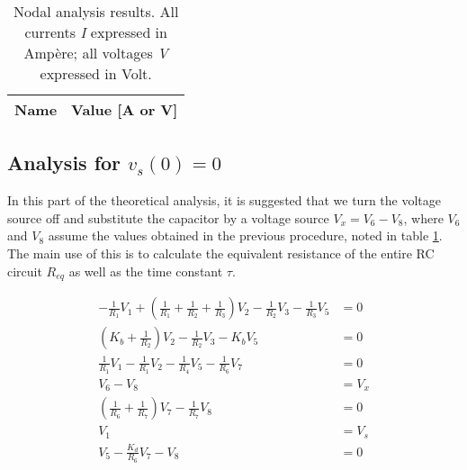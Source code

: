 \begin{table}[h]                             

\centering                                  %
                        
\def\arraystretch{1.2}                       %
\begin{tabular}{c|c}                    %
\hline                                  %

\textbf{Name}  & \textbf{Value [A or V]}\\     

\hline                                %

\hline                                %
\end{tabular}   

\caption{Nodal analysis results. All currents \textit{I} expressed in Ampère; all voltages \textit{V} expressed in Volt.}
\label{tab2}   
\end{table}                             
\FloatBarrier

\subsection{Analysis for $v_s(0)=0$}\label{sec2.2}

In this part of the theoretical analysis, it is suggested that we turn the voltage source off and substitute the capacitor by a voltage source $V_x = V_6-V_8$, where $V_6$ and $V_8$ assume the values obtained in the previous procedure, noted in table \ref{tab2}. The main use of this is to calculate the equivalent resistance of the entire RC circuit $R_{eq}$ as well as the time constant $\tau$.

\begin{equation} \label{eq3}
\begin{split}
-\frac{1}{R_1}V_1+\left(\frac{1}{R_1}+\frac{1}{R_2}+\frac{1}{R_3}\right)V_2-\frac{1}{R_2}V_3-\frac{1}{R_3}V_5&=0\\
\left(K_b+\frac{1}{R_2}\right)V_2-\frac{1}{R_2}V_3-K_b V_5&=0\\
\frac{1}{R_1}V_1-\frac{1}{R_1}V_2-\frac{1}{R_4}V_5-\frac{1}{R_6}V_7&=0\\
V_6-V_8&=V_x\\
\left(\frac{1}{R_6}+\frac{1}{R_7}\right)V_7-\frac{1}{R_7}V_8&=0\\
V_1&=V_s \\
V_5-\frac{K_d}{R_6}V_7-V_8&=0
\end{split}
\end{equation}

